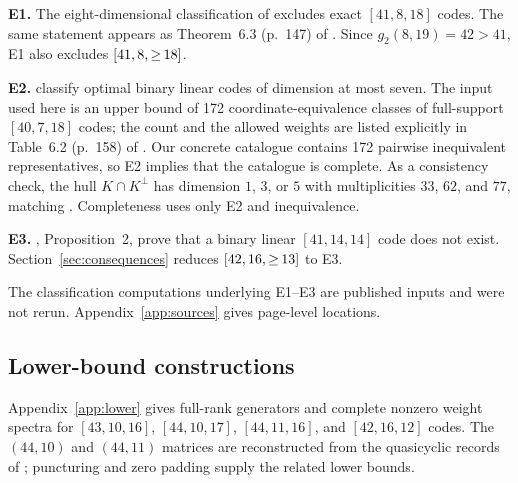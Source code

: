 \textbf{E1.} The eight-dimensional classification of \citet{bouyukliev2000} excludes exact $[41,8,18]$ codes. The same statement appears as Theorem~6.3 (p.~147) of \citet{bouyukliev2008thesis}. Since $g_2(8,19)=42>41$, E1 also excludes $\mbox{\ensuremath{[41,8,{\ge}\,18]}}$.

\textbf{E2.} \citet{bouyukliev2001} classify optimal binary linear codes of dimension at most seven. The input used here is an upper bound of 172 coordinate-equivalence classes of full-support $[40,7,18]$ codes; the count and the allowed weights are listed explicitly in Table~6.2 (p.~158) of \citet{bouyukliev2008thesis}. Our concrete catalogue contains 172 pairwise inequivalent representatives, so E2 implies that the catalogue is complete. As a consistency check, the hull $K\cap K^\perp$ has dimension $1$, $3$, or $5$ with multiplicities $33$, $62$, and $77$, matching \citet{bouyuklieva2025}. Completeness uses only E2 and inequivalence.

\textbf{E3.} \citet{bouyuklieva2020}, Proposition~2, prove that a binary linear $[41,14,14]$ code does not exist. Section~\ref{sec:consequences} reduces $\mbox{\ensuremath{[42,16,{\ge}\,13]}}$ to E3.

The classification computations underlying E1--E3 are published inputs and were not rerun. Appendix~\ref{app:sources} gives page-level locations.

\subsection{Lower-bound constructions}
Appendix~\ref{app:lower} gives full-rank generators and complete nonzero weight spectra for $[43,10,16]$, $[44,10,17]$, $[44,11,16]$, and $[42,16,12]$ codes. The $(44,10)$ and $(44,11)$ matrices are reconstructed from the quasicyclic records of \citet{grasslTables}; puncturing and zero padding supply the related lower bounds.
